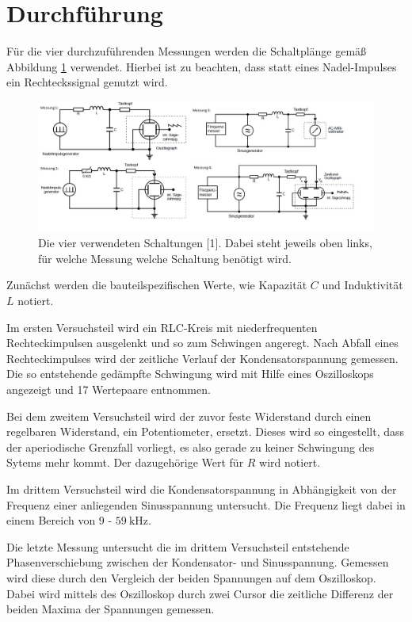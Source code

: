 \section{Durchführung}
\label{sec:Durchführung}

Für die vier durchzuführenden Messungen werden die Schaltplänge gemäß
Abbildung \ref{fig:Aufbau} verwendet. Hierbei ist zu beachten, dass statt eines 
Nadel-Impulses ein Rechteckssignal genutzt wird. 

\begin{figure}
  \centering
  \includegraphics[scale=0.4]{content/Aufbau_Schaltungen.jpg}
  \caption{Die vier verwendeten Schaltungen [1]. Dabei steht jeweils oben links, für welche 
  Messung welche Schaltung benötigt wird. }
  \label{fig:Aufbau}
\end{figure}

Zunächst werden die bauteilspezifischen Werte, wie Kapazität $C$
und Induktivität $L$ notiert. 

Im ersten Versuchsteil wird ein RLC-Kreis mit niederfrequenten 
Rechteckimpulsen ausgelenkt und so zum Schwingen angeregt. Nach Abfall
eines Rechteckimpulses wird der zeitliche Verlauf der Kondensatorspannung
gemessen. Die so entstehende gedämpfte Schwingung wird mit Hilfe eines
Oszilloskops angezeigt und 17 Wertepaare entnommen. 

Bei dem zweitem Versuchsteil wird der zuvor feste Widerstand durch einen 
regelbaren Widerstand, ein Potentiometer, ersetzt. Dieses wird so eingestellt, 
dass der aperiodische Grenzfall vorliegt, es also gerade zu keiner Schwingung des 
Sytems mehr kommt. Der dazugehörige Wert für $R$ wird notiert. 

Im drittem Versuchsteil wird die Kondensatorspannung in Abhängigkeit von 
der Frequenz einer anliegenden Sinusspannung untersucht. Die Frequenz
liegt dabei in einem Bereich von 9 - $\SI{59}{\kilo\hertz}$. 

Die letzte Messung untersucht die im drittem Versuchsteil entstehende 
Phasenverschiebung zwischen der Kondensator- und Sinusspannung. Gemessen 
wird diese durch den Vergleich der beiden Spannungen auf dem Oszilloskop.
Dabei wird mittels des Oszilloskop durch zwei Cursor die zeitliche Differenz
der beiden Maxima der Spannungen gemessen. 


